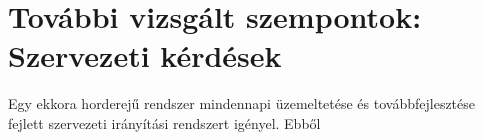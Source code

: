 \section{További vizsgált szempontok: Szervezeti kérdések}
Egy ekkora horderejű rendszer mindennapi üzemeltetése és továbbfejlesztése fejlett szervezeti irányítási rendszert igényel. Ebből